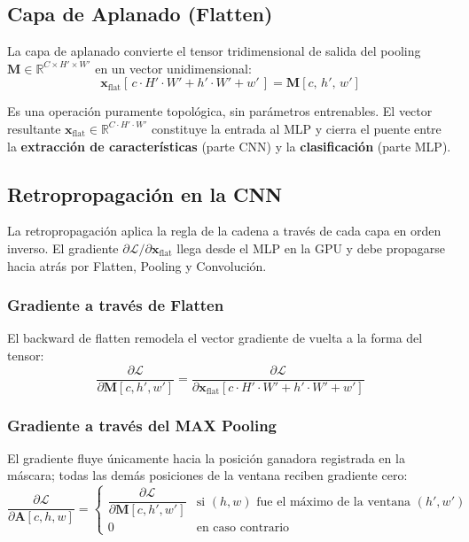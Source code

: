 \documentclass[12pt,a4paper]{article}
\newcommand{\R}{\mathbb{R}}
\begin{document}
\subsection{Capa de Aplanado (Flatten)}

La capa de aplanado convierte el tensor tridimensional de salida del pooling
$\mathbf{M} \in \R^{C \times H' \times W'}$ en un vector unidimensional:
\begin{equation}
  \mathbf{x}_{\mathrm{flat}}[\,c \cdot H' \cdot W' + h' \cdot W' + w'\,]
  = \mathbf{M}[c,\, h',\, w']
\end{equation}

Es una operación puramente topológica, sin parámetros entrenables. El vector resultante
$\mathbf{x}_{\mathrm{flat}} \in \R^{C \cdot H' \cdot W'}$ constituye la entrada al MLP
y cierra el puente entre la \textbf{extracción de características} (parte CNN) y la
\textbf{clasificación} (parte MLP).

\subsection{Retropropagación en la CNN}

La retropropagación aplica la regla de la cadena a través de cada capa en orden inverso.
El gradiente $\partial \mathcal{L}/\partial \mathbf{x}_{\mathrm{flat}}$ llega desde el
MLP en la GPU y debe propagarse hacia atrás por Flatten, Pooling y Convolución.

\subsubsection{Gradiente a través de Flatten}

El backward de flatten remodela el vector gradiente de vuelta a la forma del tensor:
\begin{equation}
  \frac{\partial \mathcal{L}}{\partial \mathbf{M}[c, h', w']}
  = \frac{\partial \mathcal{L}}{\partial
    \mathbf{x}_{\mathrm{flat}}[c \cdot H' \cdot W' + h' \cdot W' + w']}
\end{equation}

\subsubsection{Gradiente a través del MAX Pooling}

El gradiente fluye únicamente hacia la posición ganadora registrada en la máscara;
todas las demás posiciones de la ventana reciben gradiente cero:
\begin{equation}
  \frac{\partial \mathcal{L}}{\partial \mathbf{A}[c, h, w]}
  = \begin{cases}
    \dfrac{\partial \mathcal{L}}{\partial \mathbf{M}[c, h', w']}
      & \text{si } (h, w) \text{ fue el máximo de la ventana } (h',w') \\[8pt]
    0 & \text{en caso contrario}
  \end{cases}
\end{equation}
\end{document}

